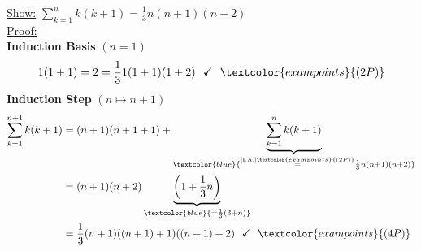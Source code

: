 {\color{solution}
\noindent
\underline{Show:} $\sum_{k=1}^{n}k(k+1) =\frac{1}{3}n(n+1)(n+2)$\\
\underline{Proof:}\\
\textbf{Induction Basis } $(n=1)$
$$
1(1+1)=2=\frac{1}{3}1(1+1)(1+2)~~\checkmark~~\textcolor{exampoints}{(2P)}
$$
\textbf{Induction Step} $(n \mapsto n+1)$
\begin{align*}
\sum_{k=1}^{n+1}k(k+1)&=(n+1)(n+1+1)+\underbrace{\sum_{k=1}^{n}k(k+1)}_{\textcolor{blue}{\stackrel{[\text{I.A.}]\textcolor{exampoints}{(2P)}}{=}\frac{1}{3}n(n+1)(n+2)}}\\
&=(n+1)(n+2)\underbrace{\left(1+\frac{1}{3}n\right)}_{\textcolor{blue}{=\frac{1}{3}(3+n)}}\\
&=\frac{1}{3}(n+1)((n+1)+1)((n+1)+2)~~\checkmark~~\textcolor{exampoints}{(4P)}
\end{align*}
}